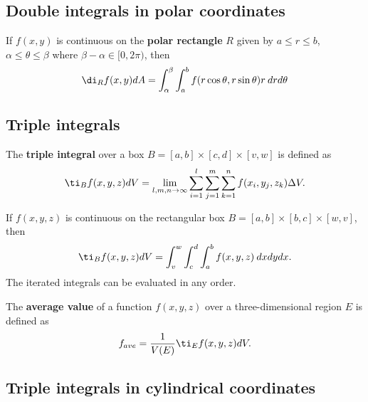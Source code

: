 \documentclass{article}
\begin{document}
\subsection{Double integrals in polar coordinates}


\begin{theorem}
    If $f(x,y)$ is continuous on the \textbf{polar rectangle} $R$
    given by $a\leq r \leq b$, $\alpha \leq \theta\leq \beta$ where
    $\beta-\alpha \in [0,2\pi)$, then
    \begin{align*}
        \di_R f(x,y)dA = \int_\alpha^\beta \int_a^b
        f(r\cos\theta, r\sin\theta)r\:drd\theta
    \end{align*}
\end{theorem}


\subsection{Triple integrals}


\begin{definition}
    The \textbf{triple integral} over a box $B=[a,b]\times[c,d]\times[v,w]$
    is defined as
    \begin{align*}
        \ti_B f(x,y,z)dV = \lim_{l,m,n\to\infty}\sum_{i=1}^l \sum_{j=1}^m \sum_{k=1}^n
        f(x_i,y_j,z_k)\Delta V.
    \end{align*}
\end{definition}
\begin{theorem}
    If $f(x,y,z)$ is continuous on the rectangular box $B=[a,b]\times[b,c]\times[w,v]$,
    then
    \begin{align*}
        \ti_B f(x,y,z) dV = \int_v^w\int_c^d \int_a^b f(x,y,z)\:dxdydx.
    \end{align*}
    The iterated integrals can be evaluated in any order.
\end{theorem}
\begin{definition}
    The \textbf{average value} of a function $f(x,y,z)$ over a three-dimensional region $E$
    is defined as
    \begin{align*}
        f_{ave} = \frac{1}{V(E)}\ti_E f(x,y,z)dV.
    \end{align*}
\end{definition}


\subsection{Triple integrals in cylindrical coordinates}
\end{document}
